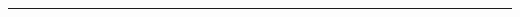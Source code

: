\documentclass[letterpaper,oneside]{article}
\begin{document}
	
\templatePagecfg

\templateFinalcfg


\inserttitle

\begin{abstract}
	\lipsum[11]
\end{abstract}\vspace{0.1cm}\rule{\textwidth}{1pt}\vspace{0.2cm}

\begin{multicols}{2}

\end{multicols}


\end{document}
